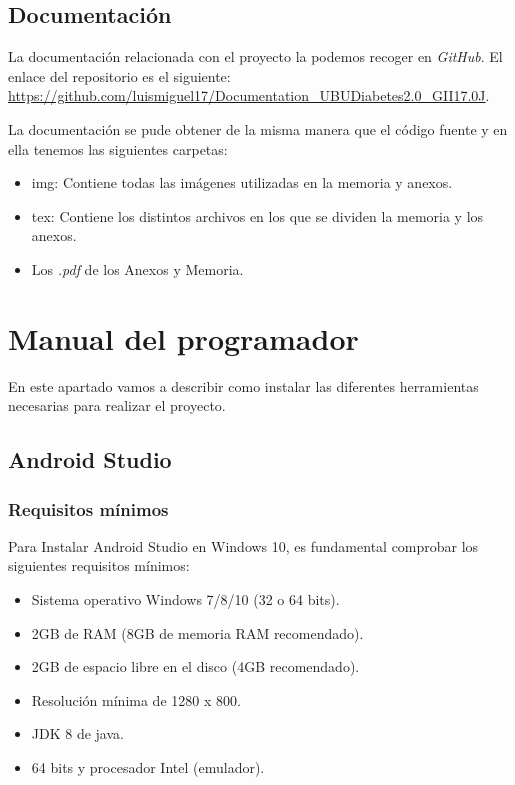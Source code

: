 \subsection{Documentación}\label{ssec:documentacion}
La documentación relacionada con el proyecto la podemos recoger en \textit{GitHub}. El enlace del repositorio es el siguiente: \url{https://github.com/luismiguel17/Documentation_UBUDiabetes2.0_GII17.0J}.

La documentación se pude obtener de la misma manera que el código fuente y en ella tenemos las siguientes carpetas:
\begin{itemize}
	\item img: Contiene todas las imágenes utilizadas en la memoria y anexos.
	\item tex: Contiene los distintos archivos en los que se dividen la memoria y los anexos.
	\item Los \textit{.pdf} de los Anexos y Memoria.
\end{itemize}

\section{Manual del programador}
En este apartado vamos a describir como instalar las diferentes herramientas necesarias para realizar el proyecto.
\subsection{Android Studio}
\subsubsection{Requisitos mínimos}
Para Instalar Android Studio en Windows 10, es fundamental comprobar los siguientes requisitos mínimos:
\begin{itemize}
	\item Sistema operativo Windows 7/8/10 (32 o 64 bits).
	\item 2GB de RAM (8GB de memoria RAM recomendado).
	\item 2GB de espacio libre en el disco (4GB recomendado).
	\item Resolución mínima de 1280 x 800.
	\item JDK 8 de java.
	\item 64 bits y procesador Intel (emulador).
\end{itemize}
